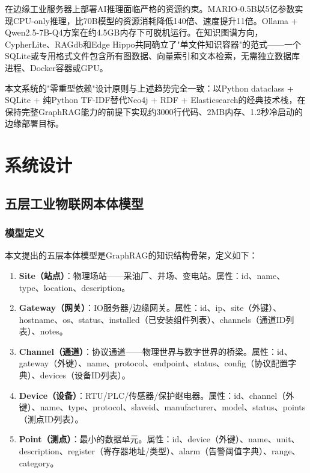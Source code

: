\documentclass[12pt,a4paper]{article}
\begin{document}
在边缘工业服务器上部署AI推理面临严格的资源约束。MARIO-0.5B\cite{mario2025}以5亿参数实现CPU-only推理，比70B模型的资源消耗降低140倍、速度提升11倍。Ollama + Qwen2.5-7B-Q4方案在约4.5GB内存下可脱机运行。在知识图谱方向，CypherLite\cite{cypherlite2026}、RAGdb\cite{khalid2025ragdb}和Edge Hippo\cite{edgehippo2025}共同确立了"单文件知识容器"的范式——一个SQLite或专用格式文件包含所有图数据、向量索引和文本检索，无需独立数据库进程、Docker容器或GPU。

本文系统的"零重型依赖"设计原则与上述趋势完全一致：以Python dataclass + SQLite + 纯Python TF-IDF替代Neo4j + RDF + Elasticsearch的经典技术栈，在保持完整GraphRAG能力的前提下实现约3000行代码、2MB内存、1.2秒冷启动的边缘部署目标。

\section{系统设计}

\subsection{五层工业物联网本体模型}

\subsubsection{模型定义}

本文提出的五层本体模型是GraphRAG的知识结构骨架，定义如下：

\begin{enumerate}
  \item \textbf{Site（站点）}：物理场站——采油厂、井场、变电站。属性：id、name、type、location、description。
  \item \textbf{Gateway（网关）}：IO服务器/边缘网关。属性：id、ip、site（外键）、hostname、os、status、installed（已安装组件列表）、channels（通道ID列表）、notes。
  \item \textbf{Channel（通道）}：协议通道——物理世界与数字世界的桥梁。属性：id、gateway（外键）、name、protocol、endpoint、status、config（协议配置字典）、devices（设备ID列表）。
  \item \textbf{Device（设备）}：RTU/PLC/传感器/保护继电器。属性：id、channel（外键）、name、type、protocol、slaveid、manufacturer、model、status、points（测点ID列表）。
  \item \textbf{Point（测点）}：最小的数据单元。属性：id、device（外键）、name、unit、description、register（寄存器地址/类型）、alarm（告警阈值字典）、range、category。
\end{enumerate}
\end{document}
